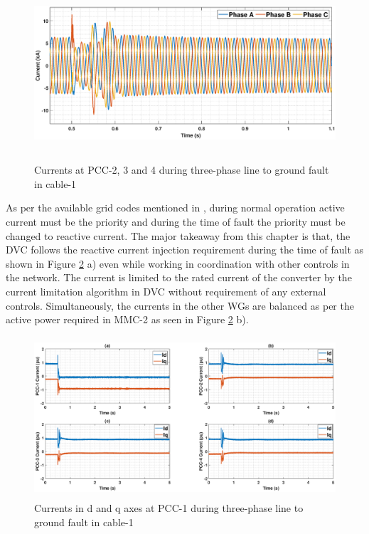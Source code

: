 \begin{figure}[H]
\centering
\captionsetup{justification=centering}
    \includegraphics[height = 6.5cm,width = 17.25cm]{Diagrams/Chapter_5/IABC_WT234_3phaseSC.eps}
    \caption{Currents at PCC-2, 3 and 4 during three-phase line to ground fault in cable-1}
    \label{IABC_WT234_3phaseSC}
\end{figure}

As per the available grid codes mentioned in \cite{mohseni_review_2012}, during normal operation active current must be the priority and during the time of fault the priority must be changed to reactive current. The major takeaway from this chapter is that, the \gls{DVC} follows the reactive current injection requirement during the time of fault as shown in Figure \ref{18_3phaseSC} a) even while working in coordination with other controls in the network. The current is limited to the rated current of the converter by the current limitation algorithm in \gls{DVC} without requirement of any external controls. Simultaneously, the currents in the other \gls{WG}s are balanced as per the active power required in \gls{MMC}-2 as seen in Figure \ref{18_3phaseSC} b). 
\vspace{-3mm}
\begin{figure}[H]
\hspace*{-1.2cm}
    \includegraphics[height = 6cm,width = 17.25cm]{Diagrams/Chapter_5/IDQ_WT1234_3phaseSC.eps}
    \caption{Currents in d and q axes at PCC-1 during three-phase line to ground fault in cable-1}
    \label{18_3phaseSC}
\end{figure}
